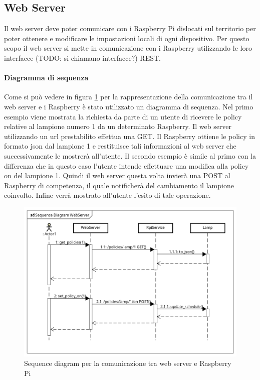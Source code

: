 \newpage
\subsection{Web Server}
Il web server deve poter comunicare con i Raspberry Pi dislocati sul territorio per poter ottenere e modificare le impostazioni locali di ogni dispositivo.
Per questo scopo il web server si mette in comunicazione con i Raspberry utilizzando le loro interfacce (TODO: si chiamano interfacce?) REST.
\paragraph{Diagramma di sequenza}
Come si può vedere in figura \ref{SD WEB} per la rappresentazione della comunicazione tra il web server e i Raspberry è stato utilizzato un diagramma di sequenza.
Nel primo esempio viene mostrata la richiesta da parte di un utente di ricevere le policy relative al lampione numero 1 da un determinato Raspberry.
Il web server utilizzando un url prestabilito effettua una GET. Il Raspberry ottiene le policy in formato json dal lampione 1 e restituisce tali informazioni al web server che successivamente le mostrerà all'utente.
Il secondo esempio è simile al primo con la differenza che in questo caso l'utente intende effettuare una modifica alla policy on del lampione 1. Quindi il web server questa volta invierà una POST al Raspberry di competenza, il quale notificherà del cambiamento il lampione coinvolto. Infine verrà mostrato all'utente l'esito di tale operazione.
\begin{figure}[tbp]
	\centering
	\includegraphics[scale=.55]{figure/Sequence_Diagram_WebServer.png}
	\caption{Sequence diagram per la comunicazione tra web server e Raspberry Pi \label{SD WEB}}
\end{figure}

